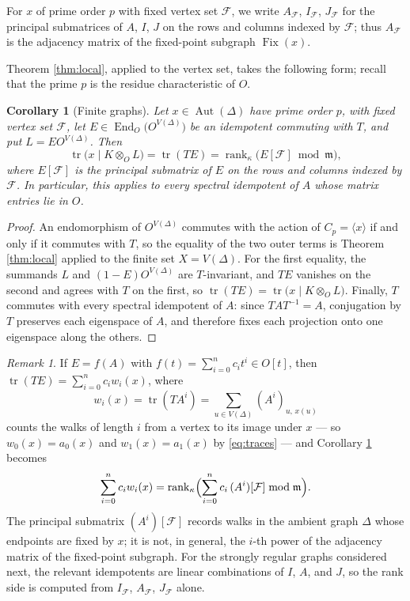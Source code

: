 \documentclass[11pt]{article}
\theoremstyle{plain}
\newtheorem{corollary}[theorem]{Corollary}
\theoremstyle{remark}
\newtheorem{remark}[theorem]{Remark}
\newcommand{\Aut}{\operatorname{Aut}}
\newcommand{\Fix}{\operatorname{Fix}}
\newcommand{\tr}{\operatorname{tr}}
\newcommand{\rank}{\operatorname{rank}}
\begin{document}
For $x$ of prime order $p$ with fixed vertex set $\mathcal F$, we write $A_{\mathcal F}$, $I_{\mathcal F}$,
$J_{\mathcal F}$ for the principal submatrices of $A$, $I$, $J$ on the rows and columns indexed by $\mathcal F$;
thus $A_{\mathcal F}$ is the adjacency matrix of the fixed-point subgraph $\Fix(x)$.

Theorem \ref{thm:local}, applied to the vertex set, takes the following form;
recall that the prime $p$ is the residue characteristic of $O$.

\begin{corollary}[Finite graphs]\label{cor:graph}
Let $x\in\Aut(\Delta)$ have prime order $p$, with fixed vertex set $\mathcal F$,
let $E\in\operatorname{End}_O\bigl(O^{V(\Delta)}\bigr)$ be an idempotent commuting with $T$, and put $L=EO^{V(\Delta)}$.
Then
\[
 \tr\bigl(x\mid K\otimes_OL\bigr)=\tr(TE)=\rank_\kappa\bigl(E[\mathcal F]\bmod\mathfrak m\bigr),
\]
where $E[\mathcal F]$ is the principal submatrix of $E$ on the rows and columns indexed by $\mathcal F$.
In particular, this applies to every spectral idempotent of $A$ whose matrix entries lie in $O$.
\end{corollary}

\begin{proof}
An endomorphism of $O^{V(\Delta)}$ commutes with the action of $C_p=\langle x\rangle$ if and only if it commutes with $T$,
so the equality of the two outer terms is Theorem \ref{thm:local} applied to the finite set $X=V(\Delta)$.
For the first equality, the summands $L$ and $(1-E)O^{V(\Delta)}$ are $T$-invariant,
and $TE$ vanishes on the second and agrees with $T$ on the first, so $\tr(TE)=\tr\bigl(x\mid K\otimes_OL\bigr)$.
Finally, $T$ commutes with every spectral idempotent of $A$: since $TAT^{-1}=A$,
conjugation by $T$ preserves each eigenspace of $A$, and therefore fixes each projection onto one eigenspace along the others.
\end{proof}

\begin{remark}\label{rem:walks}
If $E=f(A)$ with $f(t)=\sum_{i=0}^{n}c_it^i\in O[t]$, then $\tr(TE)=\sum_{i=0}^{n}c_iw_i(x)$, where
\[
 w_i(x)=\tr(TA^i)=\sum_{u\in V(\Delta)}(A^i)_{u,\,x(u)}
\]
counts the walks of length $i$ from a vertex to its image under $x$ --- so $w_0(x)=a_0(x)$ and $w_1(x)=a_1(x)$ by \eqref{eq:traces} --- and Corollary \ref{cor:graph} becomes
\[
 \sum_{i=0}^{n}c_iw_i(x)
 =\rank_\kappa\Bigl(\sum_{i=0}^{n}c_i\,(A^i)[\mathcal F]\bmod\mathfrak m\Bigr).
\]
The principal submatrix $(A^i)[\mathcal F]$ records walks in the ambient graph $\Delta$ whose endpoints are fixed by $x$;
it is not, in general, the $i$-th power of the adjacency matrix of the fixed-point subgraph.
For the strongly regular graphs considered next, the relevant idempotents are linear combinations of $I$, $A$, and $J$,
so the rank side is computed from $I_{\mathcal F}$, $A_{\mathcal F}$, $J_{\mathcal F}$ alone.
\end{remark}
\end{document}
